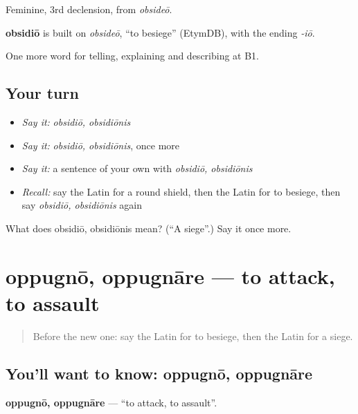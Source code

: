 Feminine, 3rd declension, from \emph{obsideō}.

\begin{cousinweb}
\textbf{obsidiō} is built on \emph{obsideō}, \textquotedblleft{}to besiege\textquotedblright{} (EtymDB), with the ending \emph{-iō}.
\end{cousinweb}

\begin{grammarlens}[title={What you've built}]
One more word for telling, explaining and describing at B1.
\end{grammarlens}

\subsection*{Your turn}
\begin{itemize}
\raggedright
  \item \emph{Say it:} \emph{obsidiō, obsidiōnis}
  \item \emph{Say it:} \emph{obsidiō, obsidiōnis}, once more
  \item \emph{Say it:} a sentence of your own with \emph{obsidiō, obsidiōnis}
  \item \emph{Recall:} say the Latin for a round shield, then the Latin for to besiege, then say \emph{obsidiō, obsidiōnis} again
\end{itemize}

\begin{tcolorbox}[breakable,colback=teal!4,colframe=teal!35!black,title={Before you move on}]
What does obsidiō, obsidiōnis mean? (\textquotedblleft{}A siege\textquotedblright{}.) Say it once more.
\end{tcolorbox}
\section[oppugnō, oppugnāre]{oppugnō, oppugnāre — to attack, to assault}

\label{lesson:LA-C341-oppugno}



\begin{quote}
Before the new one: say the Latin for to besiege, then the Latin for a siege.
\end{quote}

\subsection*{You'll want to know: oppugnō, oppugnāre}
\textbf{oppugnō, oppugnāre} — \textquotedblleft{}to attack, to assault\textquotedblright{}.

